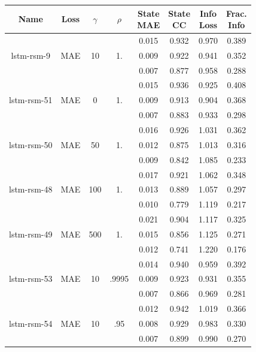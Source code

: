 \begin{table}[h!p]
\centering
    \begin{tabular}{c|c|c|c|c|c|c|c }
    \small
Name & Loss & $\gamma$ & $\rho$ & \thead{State\\MAE} & \thead{State\\CC} & \thead{Info\\Loss} &\thead{Frac.\\Info}\\
\hline
\multirow{3}{6em}{lstm-rsm-9} & \multirow{3}{3em}{MAE} & \multirow{3}{3em}{10} &  \multirow{3}{3em}{1.} & 0.015 & 0.932 & 0.970 & 0.389 \\ & & & & 0.009 & 0.922 & 0.941 & 0.352 \\ & & & & 0.007 & 0.877 & 0.958 & 0.288 \\
\hline
\hline
\multirow{3}{6em}{lstm-rsm-51} & \multirow{3}{3em}{MAE} & \multirow{3}{3em}{0} &  \multirow{3}{3em}{1.} & 0.015 & 0.936 & 0.925 & 0.408 \\ & & & & 0.009 & 0.913 & 0.904 & 0.368 \\ & & & & 0.007 & 0.883 & 0.933 & 0.298 \\
\hline
\multirow{3}{6em}{lstm-rsm-50} & \multirow{3}{3em}{MAE} & \multirow{3}{3em}{50} &  \multirow{3}{3em}{1.} & 0.016 & 0.926 & 1.031 & 0.362 \\ & & & & 0.012 & 0.875 & 1.013 & 0.316 \\ & & & & 0.009 & 0.842 & 1.085 & 0.233 \\
\hline
\multirow{3}{6em}{lstm-rsm-48} & \multirow{3}{3em}{MAE} & \multirow{3}{3em}{100} &  \multirow{3}{3em}{1.} & 0.017 & 0.921 & 1.062 & 0.348 \\ & & & & 0.013 & 0.889 & 1.057 & 0.297 \\ & & & & 0.010 & 0.779 & 1.119 & 0.217 \\
\hline
\multirow{3}{6em}{lstm-rsm-49} & \multirow{3}{3em}{MAE} & \multirow{3}{3em}{500} &  \multirow{3}{3em}{1.} & 0.021 & 0.904 & 1.117 & 0.325 \\ & & & & 0.015 & 0.856 & 1.125 & 0.271 \\ & & & & 0.012 & 0.741 & 1.220 & 0.176 \\
\hline
\hline
\multirow{3}{6em}{lstm-rsm-53} & \multirow{3}{3em}{MAE} & \multirow{3}{3em}{10} &  \multirow{3}{3em}{.9995} & 0.014 & 0.940 & 0.959 & 0.392 \\ & & & & 0.009 & 0.923 & 0.931 & 0.355 \\ & & & & 0.007 & 0.866 & 0.969 & 0.281 \\
\hline
\multirow{3}{6em}{lstm-rsm-54} & \multirow{3}{3em}{MAE} & \multirow{3}{3em}{10} &  \multirow{3}{3em}{.95} & 0.012 & 0.942 & 1.019 & 0.366 \\ & & & & 0.008 & 0.929 & 0.983 & 0.330 \\ & & & & 0.007 & 0.899 & 0.990 & 0.270 \\

\end{tabular}
\end{table}
